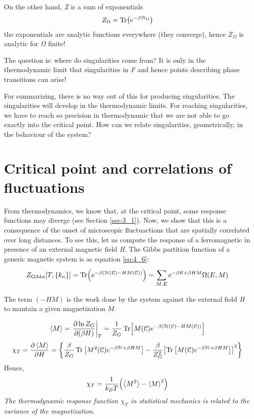 \documentclass[../main/main.tex]{subfiles}
\begin{document}
On the other hand, \emph{Z} is a sum of exponentials
\begin{equation}
  Z_ \Omega = \Tr(e^{-\beta \mathcal{H}_ \Omega } )
\end{equation}
the exponentials are analytic functions everywhere (they converge), hence \( Z_ \Omega  \) is analytic for \( \Omega  \) finite!

The question is: where do singularities come from?
It is only in the thermodynamic limit that singularities in \emph{F} and hence points describing phase transitions can arise!

For summarizing, there is no way out of this for producing singularities. The singularities will develop in the thermodynamic limits. For reaching singularities, we have to reach so precision in thermodynamic that we are not able to go exactly into the critical point. How can we relate singularities, geometrically, in the behaviour of the system?

 \section{Critical point and correlations of fluctuations}
 From thermodynamics, we know that, at the critical point, some response functions may diverge (see Section \ref{sec:3_1}). Now, we show that this is a consequence of the onset of microscopic fluctuactions that are spatially correlated over long distances.
 To see this, let us compute the response of a ferromagnetic in presence of an external magnetic field \emph{H}.
 The Gibbs partition function of a generic magnetic system is as equation \eqref{eq:4_6}:
 \begin{equation*}
   Z_{\text{Gibbs}} [T,\{ k_n \}  ] = \Tr(e^{-\beta (\mathcal{H} (\mathcal{C}) - H M (\mathcal{C}))} ) = \sum_{M,E}^{} e^{-\beta E + \beta H M} \Omega (E,M)
 \end{equation*}
\begin{remark}
The term \( (- H M) \) is the work done by the system against the external field \emph{H} to mantain a given magnetization \( M \).
\end{remark}
\begin{equation}
  \expval{M} = \eval{ \pdv{\ln{Z_G} }{(\beta H)} }_T = \frac{1}{Z_G} \Tr[M (\mathcal{C}) e^{-\beta ( \mathcal{H} (\mathcal{C}) - H M (\mathcal{C}))} ]
\end{equation}
\begin{equation}
  \chi _T = \pdv{\expval{M} }{H} = \qty{\frac{\beta }{Z_G} \Tr \qty[M^2 (\mathcal{C}) e^{-\beta \mathcal{H} + \beta H M} ] - \frac{\beta }{Z_G^2} \qty[ \Tr \qty[M (\mathcal{C}) e^{-\beta \mathcal{H} + \beta H M } ]  ]^2 }
\end{equation}
Hence,
\begin{equation}
  \chi _T = \frac{1}{k_B T} \qty(\expval{M^2} - \expval{M}^2  )
\end{equation}
\emph{The thermodynamic response function \( \chi _T \) in statistical mechanics is related to the variance of the magnetization}.
\end{document}
